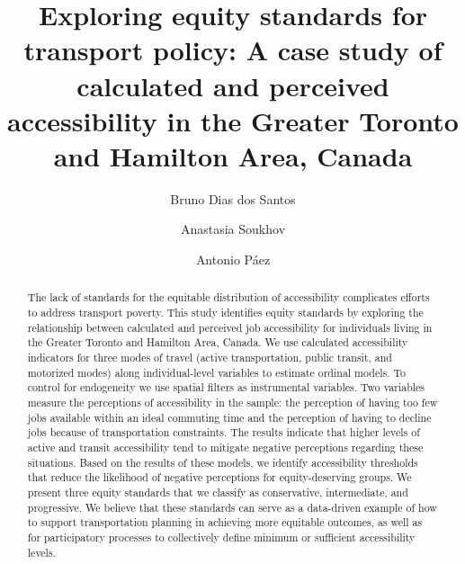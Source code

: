 \documentclass[preprint, 3p,
authoryear]{elsarticle} %
\begin{document}
\begin{frontmatter}

  \title{Exploring equity standards for transport policy: A case study
of calculated and perceived accessibility in the Greater Toronto and
Hamilton Area, Canada}
    \author[McMaster University]{Bruno Dias dos Santos%
  }
    \author[Western University]{Anastasia Soukhov%
  }
    \author[McMaster University]{Antonio Páez%
  }
  
  \begin{abstract}
  The lack of standards for the equitable distribution of accessibility
  complicates efforts to address transport poverty. This study
  identifies equity standards by exploring the relationship between
  calculated and perceived job accessibility for individuals living in
  the Greater Toronto and Hamilton Area, Canada. We use calculated
  accessibility indicators for three modes of travel (active
  transportation, public transit, and motorized modes) along
  individual-level variables to estimate ordinal models. To control for
  endogeneity we use spatial filters as instrumental variables. Two
  variables measure the perceptions of accessibility in the sample: the
  perception of having too few jobs available within an ideal commuting
  time and the perception of having to decline jobs because of
  transportation constraints. The results indicate that higher levels of
  active and transit accessibility tend to mitigate negative perceptions
  regarding these situations. Based on the results of these models, we
  identify accessibility thresholds that reduce the likelihood of
  negative perceptions for equity-deserving groups. We present three
  equity standards that we classify as conservative, intermediate, and
  progressive. We believe that these standards can serve as a
  data-driven example of how to support transportation planning in
  achieving more equitable outcomes, as well as for participatory
  processes to collectively define minimum or sufficient accessibility
  levels.
  \end{abstract}
  
 \end{frontmatter}
\end{document}
